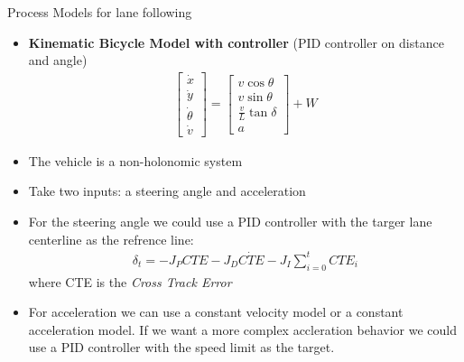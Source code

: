 \documentclass[10pt,mathserif]{beamer}
\begin{document}
\begin{frame}{Process Models for lane following}
\begin{itemize}
\item \textbf{Kinematic Bicycle Model with controller} (PID controller on distance and angle)
\begin{align}
\begin{bmatrix}
\dot{x} \\ \dot{y}\\ \dot{\theta}\\ \dot{v}
\end{bmatrix} =
\begin{bmatrix}
v\cos{\theta} \\ v\sin{\theta}\\ \frac{v}{L}\tan{\delta} \\ a 
\end{bmatrix} + W
\end{align}
\item The vehicle is a non-holonomic system 
\item Take two inputs: a steering angle and acceleration
\item For the steering angle we could use a PID controller with the targer lane centerline as the 
refrence line: 
\begin{align}
\delta_t = - J_PCTE - J_D\dot{CTE} -J_I\sum_{i=0}^tCTE_i
\end{align}
where CTE is the \textit{Cross Track Error}
\item For acceleration we can use a constant velocity model or a constant acceleration model. If we want a more complex accleration behavior we could use a PID controller with the speed limit as the target.
\end{itemize}
\end{frame}
\end{document}
